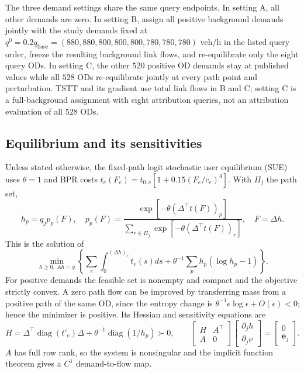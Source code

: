 The three demand settings share the same query endpoints. In setting A,
all other demands are zero. In setting B, assign all positive
background demands jointly with the study demands fixed at
$q^0=0.2q_{\mathrm{base}}=(880,880,800,800,800,780,780,780)$ veh/h in
the listed query order, freeze the resulting background link flows, and
re-equilibrate only the eight query ODs. In setting C, the other $520$
positive OD demands stay at published values while all $528$ ODs
re-equilibrate jointly at every path point and perturbation. TSTT and
its gradient use total link flows in B and C; setting C is a
full-background assignment with eight attribution queries, not an
attribution evaluation of all $528$ ODs.

\subsection{Equilibrium and its sensitivities}\label{supp:sue}
Unless stated otherwise, the fixed-path logit stochastic user equilibrium
(SUE) uses $\theta=1$ and BPR costs
$t_e(F_e)=t_{0,e}[1+0.15(F_e/c_e)^4]$. With $\Pi_j$ the path set,
\begin{equation}
h_p=q_jp_p(F),\quad
p_p(F)=\frac{\exp[-\theta(\Delta^\top t(F))_p]}
{\sum_{r\in\Pi_j}\exp[-\theta(\Delta^\top t(F))_r]},\quad
F=\Delta h.\label{eq:sueloading}
\end{equation}
This is the solution of
\[
\min_{h\ge0,\ Ah=q}\left\{
\sum_e\int_0^{(\Delta h)_e}t_e(s)ds+
\theta^{-1}\sum_p h_p(\log h_p-1)\right\}.
\]
For positive demands the feasible set is nonempty and compact and the
objective strictly convex. A zero path flow can be improved by transferring
mass from a positive path of the same OD, since the entropy change is
$\theta^{-1}\epsilon\log\epsilon+O(\epsilon)<0$; hence the minimizer is
positive. Its Hessian and sensitivity equations are
\begin{equation}
H=\Delta^\top\operatorname{diag}(t'_e)\Delta+
\theta^{-1}\operatorname{diag}(1/h_p)\succ0,\qquad
\begin{bmatrix}H&A^\top\\A&0\end{bmatrix}
\begin{bmatrix}\partial_jh\\\partial_j\nu\end{bmatrix}
=\begin{bmatrix}0\\\mathbf e_j\end{bmatrix}.
\label{eq:kkt_sensitivity}
\end{equation}
$A$ has full row rank, so the system is nonsingular and the implicit
function theorem gives a $C^1$ demand-to-flow map.

